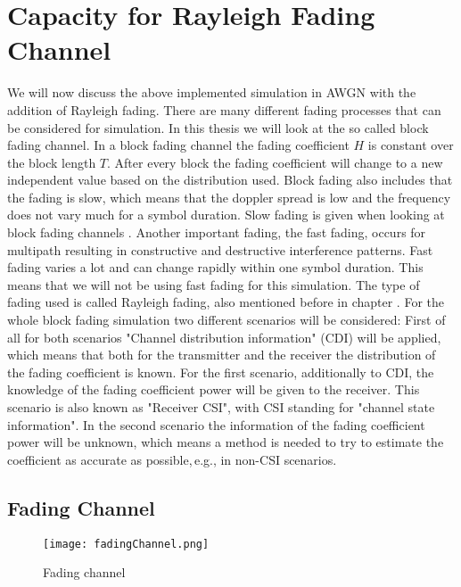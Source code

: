 \chapter{Capacity for Rayleigh Fading Channel} 
\label{chap:raychan}
\graphicspath{{C:/Users/Kevin/Bachelarbeit/Bachelorarbeit/01_Bachelorarbeit_LaTex/02_Figures/}}


We will now discuss the above implemented simulation in AWGN with the addition of Rayleigh fading. 
There are many different fading processes that can be considered for simulation. In this thesis we will look at the so called block fading channel. In a block fading channel the fading coefficient $H$ is constant over the block length $T$. After every block the fading coefficient will change to a new independent value based on the distribution used. Block fading also includes that the fading is slow, which means that the doppler spread is low and the frequency does not vary much for a symbol duration. Slow fading is given when looking at block fading channels \cite[p.~102]{Goldsmith08}. Another important fading, the fast fading, occurs for multipath resulting in constructive and destructive interference patterns. Fast fading varies a lot and can change rapidly within one symbol duration. This means that we will not be using fast fading for this simulation.
The type of fading used is called Rayleigh fading, also mentioned before in chapter . For the whole block fading simulation two different scenarios will be considered:
\newline
First of all for both scenarios "Channel distribution information" (CDI) will be applied, which means that both for the transmitter and the receiver the distribution of the fading coefficient is known. For the first scenario, additionally to CDI, the knowledge of the fading coefficient power will be given to the receiver. This scenario is also known as "Receiver CSI", with CSI standing for "channel state information".
\newline
In the second scenario the information of the fading coefficient power will be unknown, which means a method is needed to try to estimate the coefficient as accurate as possible,\,e.g., in non-CSI scenarios. 
\clearpage 
\section{Fading Channel}
\begin{figure}[!htb]
	\centering
	\texttt{[image: fadingChannel.png]}
	\caption{Fading channel}
	\label{fig:AWGN}
\end{figure}

